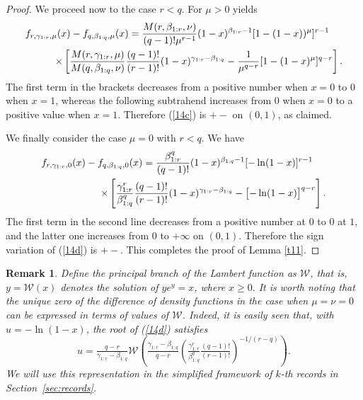 \documentclass [11pt]{article}
\newtheorem{remark}{Remark}
\begin{document}
\begin{proof}
We proceed now to the case $r<q$. For $\mu>0$ yields
\begin{eqnarray}
\lefteqn{f_{r, \gamma_{1:r}, \mu} (x) - f_{q, \beta_{1:q}, \mu} (x)
=  \frac{M(r,\beta_{1:r},\nu)}
{(q-1)!\mu^{r-1}}
(1-x)^{\beta_{1:r}-1} [1-(1-x))^\mu ]^{r-1}} \nonumber \\
& & \qquad \times \left[ 
 \frac{M(r,\gamma_{1:r},\mu)}{M(q,\beta_{1:q},\nu)}
\frac{(q-1)!}{(r-1)!}
(1-x)^{\gamma_{1:r}-\beta_{1:q}} - \frac{1}{\mu^{q-r}}
[1-(1-x)^\mu ]^{q-r} \right].
\label{14c}
\end{eqnarray}
The first term in the brackets decreases from a positive number when $x=0$ to $0$ when $x=1$, whereas the following subtrahend increases from $0$ when $x=0$ to a positive value when $x=1$. Therefore (\ref{14c}) is $+-$ on $(0,1)$, as claimed.

We finally consider the case $\mu=0$ with $r<q$. We have
\begin{eqnarray}
\lefteqn{f_{r, \gamma_{1:r}, 0} (x) - f_{q, \beta_{1:q},0} (x)
=  \frac{\beta_{1:r}^q}{(q-1)!}
(1-x)^{\beta_{1:q}-1} [-\ln(1-x)]^{r-1}} \nonumber \\
& & \qquad\qquad\quad \times \left[ \frac{\gamma_{1:r}^r}{\beta_{1:q}^q}
\frac{(q-1)!}{(r-1)!}
(1-x)^{\gamma_{1:r}-\beta_{1:q}} -
\bigl[-\ln (1-x) \bigr]^{q-r} \right].
\label{14d}
\end{eqnarray}
The first term in the second line decreases from a positive number at $0$ to $0$ at $1$, and the latter one increases from $0$ to $+\infty$
on $(0,1)$. Therefore the sign variation of (\ref{14d}) is $+-$. This completes the proof of Lemma \ref{t11}.
\end{proof}

\begin{remark}
\label{rem0}
Define the principal branch of the Lambert function as $\mathcal W$, that is, $y=\mathcal W(x)$ denotes the solution of $y e^y=x$, where $x\geq 0.$ It is worth noting that the unique zero of the difference of density functions in the case when $\mu=\nu=0$ can be expressed in terms of values of $\mathcal W$.
Indeed, it is easily seen that, with $u=-\ln(1-x)$, the root of (\ref{14d}) satisfies
$$
u=\tfrac{q-r}{\gamma_{1:r}-\beta_{1:q}}\mathcal{W}\left(\tfrac{\gamma_{1:r}-\beta_{1:q}}{q-r}
\left(\tfrac{\gamma_{1:r}^r} {\beta_{1:q}^q}
\tfrac{(q-1)!}{(r-1)!}\right)^{-1/(r-q)}\right).
$$
We will use this representation in the simplified framework of $k$-th records in Section~\ref{sec:records}.
\end{remark}
\end{document}
